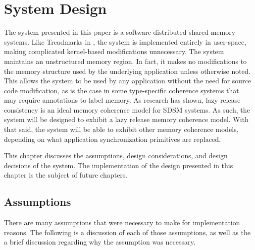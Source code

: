 \section{System Design}

The \projname{} system presented in this paper is a software distributed shared memory systems.  Like Treadmarks in \cite{Amza:1996:TSM:226705.226708,Keleher:1994:TDS:1267074.1267084}, the \projname{} system is implemented entirely in user-space, making complicated kernel-based modifications unnecessary.  The \projname{} system maintains an unstructured memory region.  In fact, it makes no modifications to the memory structure used by the underlying application unless otherwise noted.  This allows the \projname{} system to be used by any application without the need for source code modification, as is the case in some type-specific coherence systems that may require annotations to label memory.  As research has shown, lazy release consistency is an ideal memory coherence model for SDSM systems.  As such, the \projname{} system will be designed to exhibit a lazy release memory coherence model.  With that said, the \projname{} system will be able to exhibit other memory coherence models, depending on what application synchronization primitives are replaced.

This chapter discusses the assumptions, design considerations, and design decisions of the \projname{} system.  The implementation of the design presented in this chapter is the subject of future chapters.

\subsection{Assumptions}

There are many assumptions that were necessary to make for implementation reasons.  The following is a discussion of each of those assumptions, as well as the a brief discussion regarding why the assumption was necessary.

